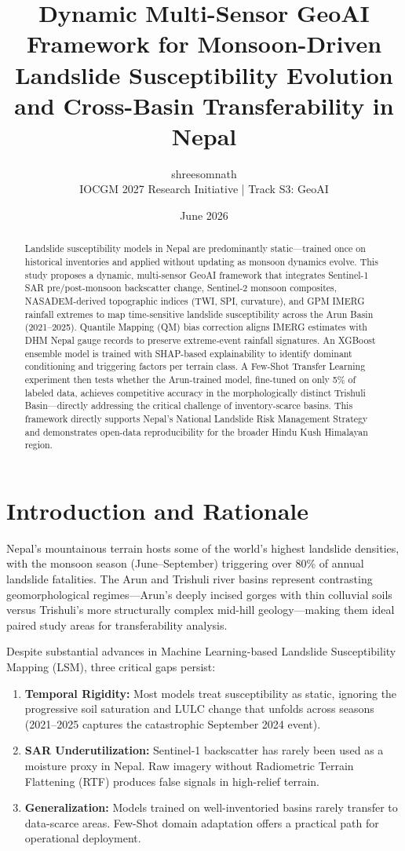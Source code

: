 \documentclass[11pt,a4paper]{article}
\title{\textbf{Dynamic Multi-Sensor GeoAI Framework for Monsoon-Driven Landslide Susceptibility Evolution and Cross-Basin Transferability in Nepal}}
\author{shreesomnath \\ \small{IOCGM 2027 Research Initiative | Track S3: GeoAI}}
\date{June 2026}
\begin{document}
\maketitle

\begin{abstract}
Landslide susceptibility models in Nepal are predominantly static---trained once on historical inventories and applied without updating as monsoon dynamics evolve. This study proposes a dynamic, multi-sensor GeoAI framework that integrates Sentinel-1 SAR pre/post-monsoon backscatter change, Sentinel-2 monsoon composites, NASADEM-derived topographic indices (TWI, SPI, curvature), and GPM IMERG rainfall extremes to map time-sensitive landslide susceptibility across the Arun Basin (2021--2025). Quantile Mapping (QM) bias correction aligns IMERG estimates with DHM Nepal gauge records to preserve extreme-event rainfall signatures. An XGBoost ensemble model is trained with SHAP-based explainability to identify dominant conditioning and triggering factors per terrain class. A Few-Shot Transfer Learning experiment then tests whether the Arun-trained model, fine-tuned on only 5\% of labeled data, achieves competitive accuracy in the morphologically distinct Trishuli Basin---directly addressing the critical challenge of inventory-scarce basins. This framework directly supports Nepal's National Landslide Risk Management Strategy and demonstrates open-data reproducibility for the broader Hindu Kush Himalayan region.
\end{abstract}

\section{Introduction and Rationale}
Nepal's mountainous terrain hosts some of the world's highest landslide densities, with the monsoon season (June--September) triggering over 80\% of annual landslide fatalities. The Arun and Trishuli river basins represent contrasting geomorphological regimes---Arun's deeply incised gorges with thin colluvial soils versus Trishuli's more structurally complex mid-hill geology---making them ideal paired study areas for transferability analysis.

Despite substantial advances in Machine Learning-based Landslide Susceptibility Mapping (LSM), three critical gaps persist:
\begin{enumerate}
    \item \textbf{Temporal Rigidity:} Most models treat susceptibility as static, ignoring the progressive soil saturation and LULC change that unfolds across seasons (2021--2025 captures the catastrophic September 2024 event).
    \item \textbf{SAR Underutilization:} Sentinel-1 backscatter has rarely been used as a moisture proxy in Nepal. Raw imagery without Radiometric Terrain Flattening (RTF) produces false signals in high-relief terrain.
    \item \textbf{Generalization:} Models trained on well-inventoried basins rarely transfer to data-scarce areas. Few-Shot domain adaptation offers a practical path for operational deployment.
\end{enumerate}
\end{document}
